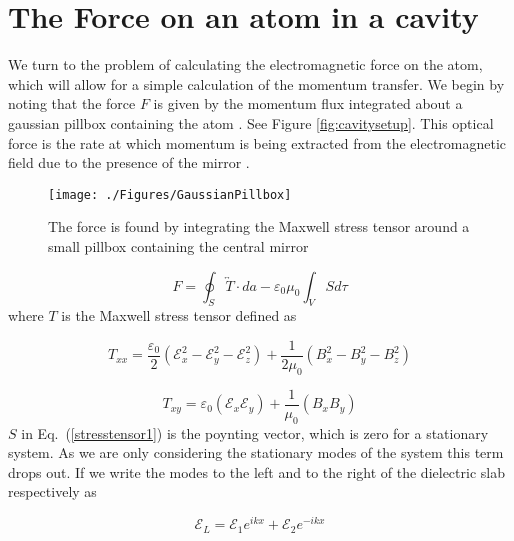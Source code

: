 \section{The Force on an atom in a cavity}
\label{sec:force}
We turn to the problem of calculating the electromagnetic force on the atom, which will allow for a simple calculation of the momentum transfer. We begin by noting that the force $F$ is given by the momentum flux integrated about a gaussian pillbox containing the atom \cite{domokos08}. See Figure \ref{fig:cavitysetup}.  This optical force is the rate at which momentum is being extracted from the electromagnetic field due to the presence of the mirror  \cite{griffiths}.  

\begin{figure}
\texttt{[image: ./Figures/GaussianPillbox]}
\caption{The force is found by integrating the Maxwell stress tensor around a small pillbox containing the central mirror}
\label{fig:gaussianpillbox}
\end{figure}

\begin{equation}
F=\oint_{S}\overleftrightarrow{T}\cdot da-\varepsilon_{0}\mu_{0}\int_{V}Sd\tau
\label{stresstensor1}
\end{equation}
where $T$ is the Maxwell stress tensor defined as

\begin{equation}
T_{xx}=\frac{\varepsilon_{0}}{2}\left(\mathcal{E}_{x}^{2}-\mathcal{E}_{y}^{2}-\mathcal{E}_{z}^{2}\right)+\frac{1}{2\mu_{0}}\left(B_{x}^{2}-B_{y}^{2}-B_{z}^{2}\right)
\label{stresstensor2}
\end{equation}


\begin{equation}
T_{xy}=\varepsilon_{0}\left(\mathcal{E}_{x}\mathcal{E}_{y}\right)+\frac{1}{\mu_{0}}\left(B_{x}B_{y}\right)
\label{stresstensor3}
\end{equation}
$S$ in Eq.\ (\ref{stresstensor1}) is the poynting vector, which is zero for a stationary system.  As we are only considering the stationary modes of the system this term drops out.
If we write the modes to the left and to the right of the dielectric
slab respectively as

\begin{equation}
\mathcal{E}_{L}=\mathcal{E}_{1}e^{ikx}+\mathcal{E}_{2}e^{-ikx}
\label{Efieldleft}
\end{equation}


